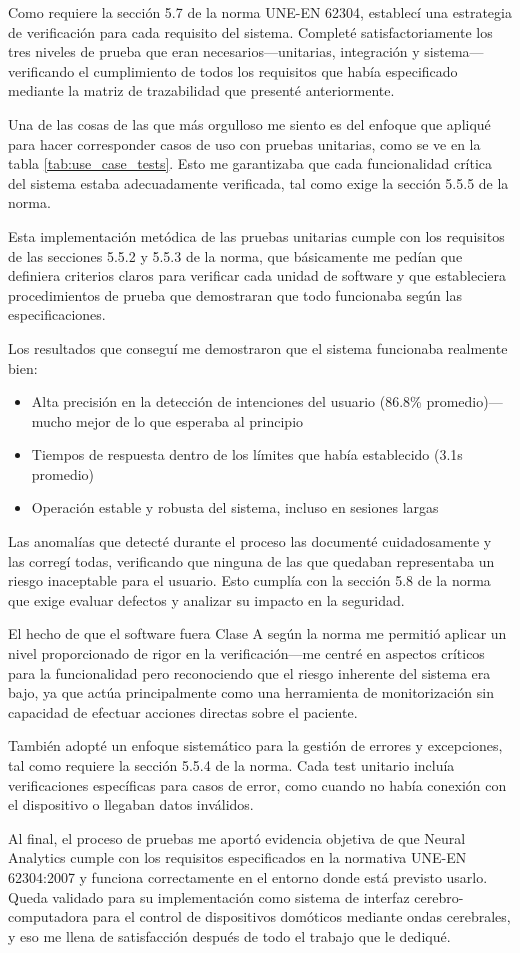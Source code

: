 Como requiere la sección 5.7 de la norma UNE-EN 62304, establecí una estrategia de verificación para cada requisito del sistema. Completé satisfactoriamente los tres niveles de prueba que eran necesarios—unitarias, integración y sistema—verificando el cumplimiento de todos los requisitos que había especificado mediante la matriz de trazabilidad que presenté anteriormente.

Una de las cosas de las que más orgulloso me siento es del enfoque que apliqué para hacer corresponder casos de uso con pruebas unitarias, como se ve en la tabla \ref{tab:use_case_tests}. Esto me garantizaba que cada funcionalidad crítica del sistema estaba adecuadamente verificada, tal como exige la sección 5.5.5 de la norma.

Esta implementación metódica de las pruebas unitarias cumple con los requisitos de las secciones 5.5.2 y 5.5.3 de la norma, que básicamente me pedían que definiera criterios claros para verificar cada unidad de software y que estableciera procedimientos de prueba que demostraran que todo funcionaba según las especificaciones.

Los resultados que conseguí me demostraron que el sistema funcionaba realmente bien:

\begin{itemize}
    \item Alta precisión en la detección de intenciones del usuario (86.8\% promedio)—mucho mejor de lo que esperaba al principio
    \item Tiempos de respuesta dentro de los límites que había establecido (3.1s promedio)
    \item Operación estable y robusta del sistema, incluso en sesiones largas
\end{itemize}

Las anomalías que detecté durante el proceso las documenté cuidadosamente y las corregí todas, verificando que ninguna de las que quedaban representaba un riesgo inaceptable para el usuario. Esto cumplía con la sección 5.8 de la norma que exige evaluar defectos y analizar su impacto en la seguridad.

El hecho de que el software fuera Clase A según la norma me permitió aplicar un nivel proporcionado de rigor en la verificación—me centré en aspectos críticos para la funcionalidad pero reconociendo que el riesgo inherente del sistema era bajo, ya que actúa principalmente como una herramienta de monitorización sin capacidad de efectuar acciones directas sobre el paciente.

También adopté un enfoque sistemático para la gestión de errores y excepciones, tal como requiere la sección 5.5.4 de la norma. Cada test unitario incluía verificaciones específicas para casos de error, como cuando no había conexión con el dispositivo o llegaban datos inválidos.

Al final, el proceso de pruebas me aportó evidencia objetiva de que Neural Analytics cumple con los requisitos especificados en la normativa UNE-EN 62304:2007 y funciona correctamente en el entorno donde está previsto usarlo. Queda validado para su implementación como sistema de interfaz cerebro-computadora para el control de dispositivos domóticos mediante ondas cerebrales, y eso me llena de satisfacción después de todo el trabajo que le dediqué.
